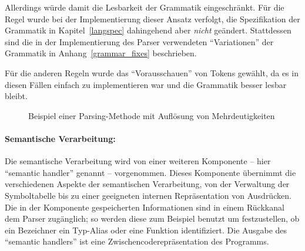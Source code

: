 \documentclass[twoside,a4paper,fleqn,12pt]{book}
\begin{document}
Allerdings würde damit die Lesbarkeit der Grammatik eingeschränkt. Für die Regel  wurde bei der Implementierung dieser Ansatz verfolgt,
die Spezifikation der Grammatik in Kapitel~\ref{langspec} dahingehend aber \emph{nicht} geändert.
Stattdessen sind die in der Implementierung des Parser verwendeten "`Variationen"' der Grammatik in Anhang~\ref{grammar_fixes} beschrieben.

Für die anderen Regeln wurde das "`Vorausschauen"' von Tokens gewählt, da es in diesen Fällen einfach zu implementieren war
und die Grammatik besser lesbar bleibt.

\begin{figure}[!h]
   \centering
  
  \caption{Beispiel einer Parsing-Methode mit Auflösung von Mehrdeutigkeiten}
  \label{fig:ParseProgramStatements}
\end{figure}

\paragraph{Semantische Verarbeitung:}
Die semantische Verarbeitung wird von einer weiteren Komponente -- hier ``semantic handler'' genannt -- vorgenommen. 
Dieses Komponente übernimmt die verschiedenen Aspekte der semantischen Verarbeitung, von der Verwaltung der
Symboltabelle bis zu einer geeigneten internen Repräsentation von Ausdrücken. Die in der Komponente gespeicherten Informationen sind
in einem Rückkanal dem Parser zugänglich; so werden diese zum Beispiel benutzt um festzustellen, ob ein Bezeichner ein
Typ-Alias oder eine Funktion identifiziert.
Die Ausgabe des ``semantic handlers'' ist eine Zwischencoderepräsentation des Programms.


\end{document}

